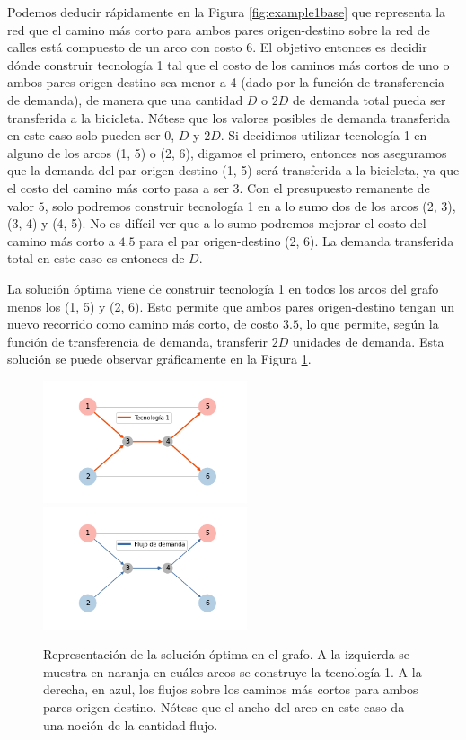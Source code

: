 \documentclass{article}
\begin{document}
  Podemos deducir rápidamente en la Figura \ref{fig:example1base} que representa la red que el camino más corto para ambos pares origen-destino sobre la red de calles está compuesto de un arco con costo 6. El objetivo entonces es decidir dónde construir tecnología 1 tal que el costo de los caminos más cortos de uno o ambos pares origen-destino sea menor a 4 (dado por la función de transferencia de demanda), de manera que una cantidad $D$ o $2D$ de demanda total pueda ser transferida a la bicicleta. Nótese que los valores posibles de demanda transferida en este caso solo pueden ser $0$, $D$ y $2D$. Si decidimos utilizar tecnología 1 en alguno de los arcos (1, 5) o (2, 6), digamos el primero, entonces nos aseguramos que la demanda del par origen-destino (1, 5) será transferida a la bicicleta, ya que el costo del camino más corto pasa a ser $3$. Con el presupuesto remanente de valor $5$, solo podremos construir tecnología 1 en a lo sumo dos de los arcos (2, 3), (3, 4) y (4, 5). No es difícil ver que a lo sumo podremos mejorar el costo del camino más corto a $4.5$ para el par origen-destino (2, 6). La demanda transferida total en este caso es entonces de $D$.

  La solución óptima viene de construir tecnología 1 en todos los arcos del grafo menos los (1, 5) y (2, 6). Esto permite que ambos pares origen-destino tengan un nuevo recorrido como camino más corto, de costo $3.5$, lo que permite, según la función de transferencia de demanda, transferir $2D$ unidades de demanda. Esta solución se puede observar gráficamente en la Figura \ref{fig:example1solution}.

  \begin{figure}[h!]
    \centering
    \includegraphics[width=6cm]{../resources/example_1_infras.png}
    \includegraphics[width=6cm]{../resources/example_1_flows.png}
    \caption{Representación de la solución óptima en el grafo. A la izquierda se muestra en naranja en cuáles arcos se construye la tecnología 1. A la derecha, en azul, los flujos sobre los caminos más cortos para ambos pares origen-destino. Nótese que el ancho del arco en este caso da una noción de la cantidad flujo.}
    \label{fig:example1solution}
  \end{figure}
\end{document}
